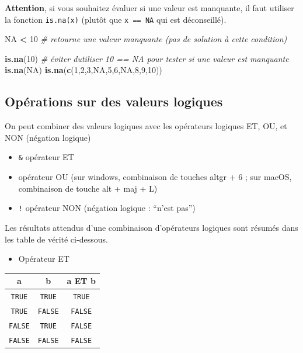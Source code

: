 \documentclass[
]{book}
\newenvironment{Shaded}{\begin{snugshade}}{\end{snugshade}}
\newcommand{\CommentTok}[1]{\textcolor[rgb]{0.56,0.35,0.01}{\textit{#1}}}
\newcommand{\ConstantTok}[1]{\textcolor[rgb]{0.56,0.35,0.01}{#1}}
\newcommand{\DecValTok}[1]{\textcolor[rgb]{0.00,0.00,0.81}{#1}}
\newcommand{\FunctionTok}[1]{\textcolor[rgb]{0.13,0.29,0.53}{\textbf{#1}}}
\newcommand{\NormalTok}[1]{#1}
\newcommand{\SpecialCharTok}[1]{\textcolor[rgb]{0.81,0.36,0.00}{\textbf{#1}}}
\providecommand{\tightlist}{%
  \setlength{\itemsep}{0pt}\setlength{\parskip}{0pt}}
\begin{document}
\textbf{Attention}, si vous souhaitez évaluer si une valeur est manquante, il faut utiliser la fonction \texttt{is.na(x)} (plutôt que \texttt{x\ ==\ NA} qui est déconseillé).

\begin{Shaded}
\begin{Highlighting}[]
\ConstantTok{NA} \SpecialCharTok{\textless{}} \DecValTok{10} \CommentTok{\# retourne une valeur manquante (pas de solution à cette condition)}

\FunctionTok{is.na}\NormalTok{(}\DecValTok{10}\NormalTok{) }\CommentTok{\# éviter d\textquotesingle{}utiliser 10 == NA pour tester si une valeur est manquante}
\FunctionTok{is.na}\NormalTok{(}\ConstantTok{NA}\NormalTok{)}
\FunctionTok{is.na}\NormalTok{(}\FunctionTok{c}\NormalTok{(}\DecValTok{1}\NormalTok{,}\DecValTok{2}\NormalTok{,}\DecValTok{3}\NormalTok{,}\ConstantTok{NA}\NormalTok{,}\DecValTok{5}\NormalTok{,}\DecValTok{6}\NormalTok{,}\ConstantTok{NA}\NormalTok{,}\DecValTok{8}\NormalTok{,}\DecValTok{9}\NormalTok{,}\DecValTok{10}\NormalTok{))}
\end{Highlighting}
\end{Shaded}

\subsection{Opérations sur des valeurs logiques}\label{opuxe9rations-sur-des-valeurs-logiques}

On peut combiner des valeurs logiques avec les opérateurs logiques ET, OU, et NON (négation logique)

\begin{itemize}
\tightlist
\item
  \texttt{\&} opérateur ET
\item
  \texttt{\textbar{}} opérateur OU (sur windows, combinaison de touches altgr + 6 ; sur macOS, combinaison de touche alt + maj + L)
\item
  \texttt{!} opérateur NON (négation logique : ``n'est pas'')
\end{itemize}

Les résultats attendus d'une combinaison d'opérateurs logiques sont résumés dans les table de vérité ci-dessous.

\begin{itemize}
\tightlist
\item
  Opérateur ET
\end{itemize}

\begin{longtable}[]{@{}ccc@{}}
\toprule\noalign{}
a & b & a ET b \\
\midrule\noalign{}
\endhead
\bottomrule\noalign{}
\endlastfoot
\texttt{TRUE} & \texttt{TRUE} & \texttt{TRUE} \\
\texttt{TRUE} & \texttt{FALSE} & \texttt{FALSE} \\
\texttt{FALSE} & \texttt{TRUE} & \texttt{FALSE} \\
\texttt{FALSE} & \texttt{FALSE} & \texttt{FALSE} \\
\end{longtable}
\end{document}
